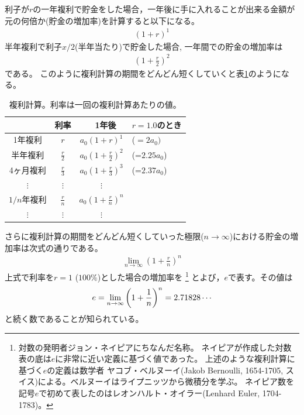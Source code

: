 \documentclass[twocolumn,11pt]{jarticle}
\begin{document}
利子が$r$の一年複利で貯金をした場合，一年後に手に入れることが出来る金額が元の何倍か(貯金の増加率)を計算すると以下になる。
\begin{align*}
  (1+r)^1
\end{align*}
半年複利で利子$x/2$(半年当たり)で貯金した場合, 一年間での貯金の増加率は
\begin{align*}
  \displaystyle \left(1+\frac{r}{2}\right)^2
\end{align*}
である。
このように複利計算の期間をどんどん短くしていくと表\ref{tab:money}のようになる。
{\small
\begin{table}[t]
  \centering
  \caption{複利計算。利率は一回の複利計算あたりの値。}
  \label{tab:money}
  \begin{tabular}[h]{|c|c|cl|}\hline
         & 利率                        &　1年後          & $r=1.0$のとき\\\hline
1年複利  & $r$                         & $a_0(1+r)^1$    & ($=2a_0)$ \\
半年複利 & $\displaystyle\frac{r}{2}$  & $\displaystyle a_0\left(1+\frac{r}{2}\right)^2$&(=$2.25a_0$)\\
4ヶ月複利& $\displaystyle\frac{r}{3}$  & $\displaystyle a_0\left(1+\frac{r}{3}\right)^3$&(=$2.37a_0$)\\
$\vdots$ & $\displaystyle\vdots$       & $\vdots$ & \\
$1/n$年複利 & $\displaystyle\frac{r}{n}$   & $\displaystyle a_0\left(1+\frac{r}{n}\right)^n$&\\
$\vdots$ & $\displaystyle\vdots$       & $\vdots$  &\\\hline
  \end{tabular}
\end{table}
}
さらに複利計算の期間をどんどん短くしていった極限($n\to\infty$)における貯金の増加率は次式の通りである。
\begin{align}
	\label{eq:Napier-exp}
  \lim_{n\to\infty} \left( 1+\frac{r}{n} \right)^n
  \end{align}
上式で利率を$r=1$ ($100\%$)とした場合の増加率を
\footnote{対数の発明者ジョン・ネイピアにちなんだ名称。
ネイピアが作成した対数表の底は$e$に非常に近い定義に基づく値であった。
上述のような複利計算に基づく$e$の定義は数学者
{ヤコブ・ベルヌーイ}(Jakob Bernoulli, 1654-1705, スイス)による。ベルヌーイはライプニッツから微積分を学ぶ。
ネイピア数を記号$e$で初めて表したのはレオンハルト・オイラー(Lenhard Euler, 1704-1783)。
}
とよび，$e$で表す。その値は
\begin{align}
e=\lim_{n\to\infty}\left(1+\frac{1}{n}\right)^{n}=2.71828\cdots\notag
\end{align}
と続く数であることが知られている。
\end{document}
